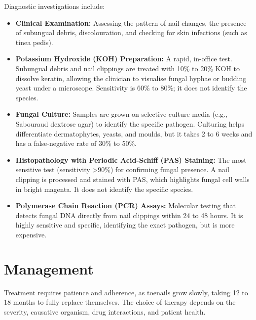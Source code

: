 Diagnostic investigations include:
\begin{itemize}
    \item \textbf{Clinical Examination:} Assessing the pattern of nail changes, the presence of subungual debris, discolouration, and checking for skin infections (such as tinea pedis).
    \item \textbf{Potassium Hydroxide (KOH) Preparation:} A rapid, in-office test. Subungual debris and nail clippings are treated with 10\% to 20\% KOH to dissolve keratin, allowing the clinician to visualise fungal hyphae or budding yeast under a microscope. Sensitivity is 60\% to 80\%; it does not identify the species.
    \item \textbf{Fungal Culture:} Samples are grown on selective culture media (e.g., Sabouraud dextrose agar) to identify the specific pathogen. Culturing helps differentiate dermatophytes, yeasts, and moulds, but it takes 2 to 6 weeks and has a false-negative rate of 30\% to 50\%.
    \item \textbf{Histopathology with Periodic Acid-Schiff (PAS) Staining:} The most sensitive test (sensitivity >90\%) for confirming fungal presence. A nail clipping is processed and stained with PAS, which highlights fungal cell walls in bright magenta. It does not identify the specific species.
    \item \textbf{Polymerase Chain Reaction (PCR) Assays:} Molecular testing that detects fungal DNA directly from nail clippings within 24 to 48 hours. It is highly sensitive and specific, identifying the exact pathogen, but is more expensive.
\end{itemize}

\section*{Management}
Treatment requires patience and adherence, as toenails grow slowly, taking 12 to 18 months to fully replace themselves. The choice of therapy depends on the severity, causative organism, drug interactions, and patient health.

